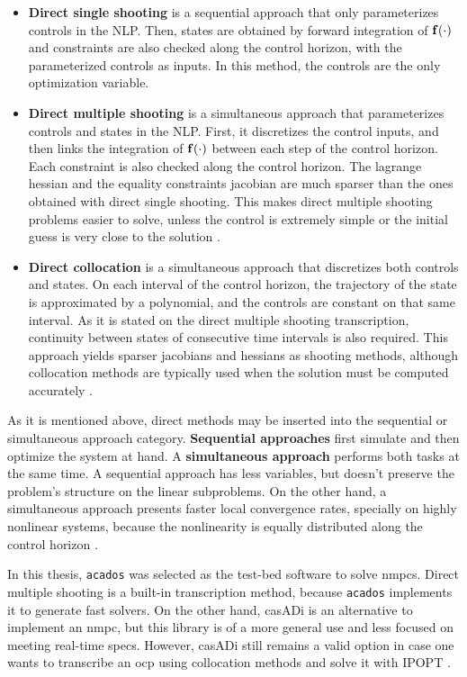 \begin{itemize}[label=\raisebox{0.5ex}{\scalebox{0.4}{$\blacksquare$}}]
\item \textbf{Direct single shooting} is a sequential approach that only parameterizes controls in the NLP. Then, states are obtained by forward integration of $\mathbf{f}(\cdot)$ and constraints are also checked along the control horizon, with the parameterized controls as inputs. In this method, the controls are the only optimization variable.
\item \textbf{Direct multiple shooting} is a simultaneous approach that parameterizes controls and states in the NLP. First, it discretizes the control inputs, and then links the integration of $\mathbf{f}(\cdot)$ between each step of the control horizon. Each constraint is also checked along the control horizon. The lagrange hessian and the equality constraints jacobian are much sparser than the ones obtained with direct single shooting. This makes direct multiple shooting problems easier to solve, unless the control is extremely simple or the initial guess is very close to the solution \cite{Silva2022msc}.
\item \textbf{Direct collocation} is a simultaneous approach that discretizes both controls and states. On each interval of the control horizon, the trajectory of the state is approximated by a polynomial, and the controls are constant on that same interval. As it is stated on the direct multiple shooting transcription, continuity between states of consecutive time intervals is also required. This approach yields sparser jacobians and hessians as shooting methods, although collocation methods are typically used when the solution must be computed accurately \cite{Silva2022msc}.
\end{itemize}

As it is mentioned above, direct methods may be inserted into the sequential or simultaneous approach category. \textbf{Sequential approaches} first simulate and then optimize the system at hand. A \textbf{simultaneous approach} performs both tasks at the same time. A sequential approach has less variables, but doesn't preserve the problem's structure on the linear subproblems. On the other hand, a simultaneous approach presents faster local convergence rates, specially on highly nonlinear systems, because the nonlinearity is equally distributed along the control horizon \cite{diehl2009efficient}.

In this thesis, \texttt{acados} was selected as the test-bed software to solve \acrshort{nmpc}s. Direct multiple shooting is a built-in transcription method, because \texttt{acados} implements it to generate fast solvers. On the other hand, casADi is an alternative to implement an \acrshort{nmpc}, but this library is of a more general use and less focused on meeting real-time specs. However, casADi still remains a valid option in case one wants to transcribe an \acrshort{ocp} using collocation methods and solve it with IPOPT \cite{wachter2006implementation}.

